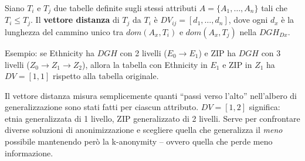 \documentclass[a4paper,11pt]{article}
\begin{document}
\begin{center}
\end{center}

\begin{definizione}
Siano $T_i$ e $T_j$ due tabelle definite sugli stessi attributi $A = \{A_1, \ldots, A_n\}$ tali che $T_i \leq T_j$. Il \textbf{vettore distanza} di $T_j$ da $T_i$ \`{e} $DV_{ij} = [d_1, \ldots, d_n]$, dove ogni $d_x$ \`{e} la lunghezza del cammino unico tra $dom(A_x, T_i)$ e $dom(A_x, T_j)$ nella $DGH_{Dx}$.

Esempio: se Ethnicity ha $DGH$ con 2 livelli ($E_0 \to E_1$) e ZIP ha $DGH$ con 3 livelli ($Z_0 \to Z_1 \to Z_2$), allora la tabella con Ethnicity in $E_1$ e ZIP in $Z_1$ ha $DV = [1, 1]$ rispetto alla tabella originale.
\end{definizione}

\begin{nota}
Il vettore distanza misura semplicemente quanti ``passi verso l'alto'' nell'albero di generalizzazione sono stati fatti per ciascun attributo. $DV = [1, 2]$ significa: etnia generalizzata di 1 livello, ZIP generalizzato di 2 livelli. Serve per confrontare diverse soluzioni di anonimizzazione e scegliere quella che generalizza il \emph{meno} possibile mantenendo però la k-anonymity -- ovvero quella che perde meno informazione.
\end{nota}
\end{document}
